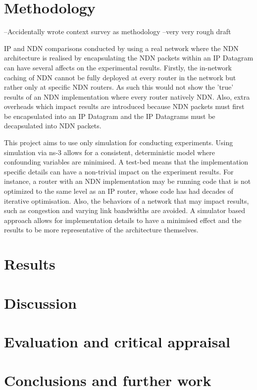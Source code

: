 \documentclass[12pt]{report}
\begin{document}
\clearpage
\chapter{Methodology}
    --Accidentally wrote context survey as methodology --very very rough draft
 
    
    IP and NDN comparisons conducted by using a real network where the NDN architecture is realised by encapsulating the NDN packets within an IP Datagram can have several affects on the experimental results. Firstly, the in-network caching of NDN cannot be fully deployed at every router in the network but rather only at specific NDN routers. As such this would not show the 'true' results of an NDN implementation where every router natively NDN. Also, extra overheads which impact results are introduced because NDN packets must first be encapsulated into an IP Datagram and the IP Datagrams must be decapsulated into NDN packets.   


    This project aims to use only simulation for conducting experiments.
    Using simulation via ns-3 allows for a consistent, deterministic model where confounding variables are minimised.  A test-bed means that the implementation specific details can have a non-trivial impact on the experiment results. For instance, a router with an NDN implementation may be running code that is not optimized to the same level as an IP router, whose code has had decades of iterative optimisation. Also, the behaviors of a network that may impact results, such as congestion and varying link bandwidths are avoided. A simulator based approach allows for implementation details to have a minimised effect and the results to be more representative of the architecture themselves.
\clearpage
\chapter{Results}
\clearpage
\chapter{Discussion}
\clearpage
\chapter{Evaluation and critical appraisal}
\clearpage
\chapter{Conclusions and further work}
\clearpage
\end{document}
